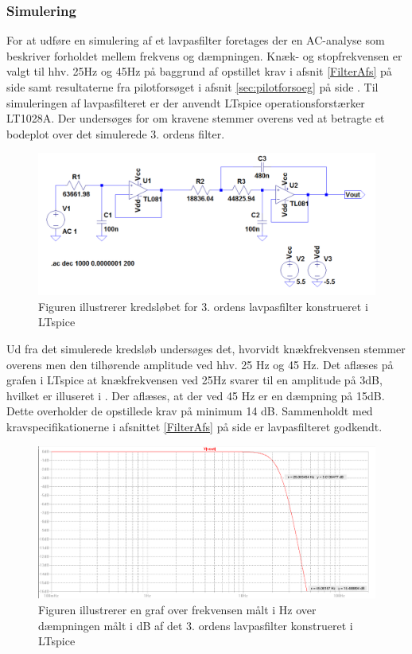 \subsubsection{Simulering}
For at udføre en simulering af et lavpasfilter foretages der en AC-analyse som beskriver forholdet mellem frekvens og dæmpningen. Knæk- og stopfrekvensen er valgt til hhv. 25Hz og 45Hz på baggrund af opstillet krav i afsnit \ref{FilterAfs} på side \pageref{FilterAfs} samt resultaterne fra pilotforsøget i afsnit \ref{sec:pilotforsoeg} på side \pageref{sec:pilotforsoeg}. Til simuleringen af lavpasfilteret er der anvendt LTspice operationsforstærker LT1028A. Der undersøges for om kravene stemmer overens ved at betragte et bodeplot over det simulerede 3. ordens filter.

\begin{figure}[H]
	\centering
	\includegraphics[scale=0.4]{figures/cProblemloesning/Lavpasfilter_LTspice.PNG}
	\caption{Figuren illustrerer kredsløbet for 3. ordens lavpasfilter konstrueret i LTspice}
	\label{fig:lavpasfilter_LTspice}
\end{figure}

Ud fra det simulerede kredsløb undersøges det, hvorvidt knækfrekvensen stemmer overens men den tilhørende amplitude ved hhv. 25 Hz og 45 Hz. Det aflæses på grafen i LTspice at knækfrekvensen ved 25Hz svarer til en amplitude på 3dB, hvilket er illuseret i . Der aflæses, at der ved 45 Hz er en dæmpning på 15dB. Dette overholder de opstillede krav på minimum 14 dB. Sammenholdt med kravspecifikationerne i afsnittet \ref{FilterAfs} på side \pageref{FilterAfs} er lavpasfilteret godkendt.

\begin{figure}[H]
	\centering
	\includegraphics[scale=0.4]{figures/cProblemloesning/Lavpasfiltergraf_LTspice1.PNG}
	\caption{Figuren illustrerer en graf over frekvensen målt i Hz over dæmpningen målt i dB af det 3. ordens lavpasfilter konstrueret i LTspice}
	\label{fig:lavpasfilter_LTspice}
\end{figure}

